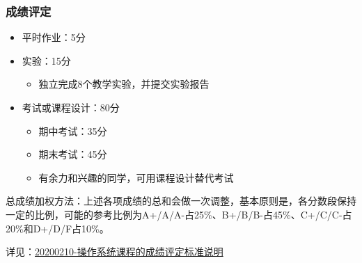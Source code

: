 \documentclass[UTF8]{ctexbeamer}
\begin{document}
\begin{frame}
    \frametitle{成绩评定}
    \begin{itemize}
        \item 平时作业：5分
        \item 实验：15分
        \begin{itemize}
            \item 独立完成8个教学实验，并提交实验报告
        \end{itemize}
        \item 考试或课程设计：80分
        \begin{itemize}
            \item 期中考试：35分
            \item 期末考试：45分
            \item 有余力和兴趣的同学，可用课程设计替代考试
        \end{itemize}

    \end{itemize}

    总成绩加权方法：上述各项成绩的总和会做一次调整，基本原则是，各分数段保持一定的比例，可能的参考比例为A+/A/A-占25\%、B+/B/B-占45\%、C+/C/C-占20\%和D+/D/F占10\%。 

    详见：\href{http://os.cs.tsinghua.edu.cn/oscourse/OS2020spring/log#A20200210-.2BZM1PXHz7ft.2BL.2FnoLdoRiEH7pi8RbmmgHUcaL9GYO-}{20200210-操作系统课程的成绩评定标准说明}
    
\end{frame}

\end{document}
